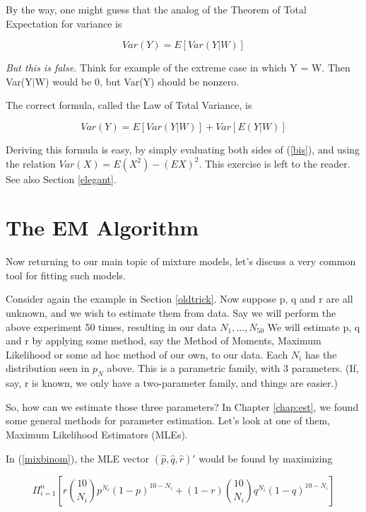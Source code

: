 By the way, one might guess that the analog of the Theorem of Total Expectation
for variance is

\begin{equation}
Var(Y)=E[Var(Y|W)]
\end{equation}

\textit{But this is false.} Think for example of the extreme case in which Y
= W. Then Var(Y$|$W) would be 0, but Var(Y) should be nonzero.

The correct formula, called the Law of Total Variance, is

\begin{equation}
\label{bis}
Var(Y)=E[Var(Y|W)]+Var[E(Y|W)]
\end{equation}

Deriving this formula is easy, by simply evaluating both sides of
(\ref{bis}), and using the relation $Var(X) = E(X^2) -(EX)^2$. This
exercise is left to the reader.  See also Section \ref{elegant}.

\section{The EM Algorithm}
\label{emalg}

Now returning to our main topic of mixture models, let's discuss a very
common tool for fitting such models.

Consider again the example in Section \ref{oldtrick}.  Now suppose p, q
and r are all unknown, and we wish to estimate them from data. Say we
will perform the above experiment 50 times, resulting in our data
$N_1,...,N_{50}$ We will estimate p, q and r by applying some method,
say the Method of Moments, Maximum Likelihood or some ad hoc method of
our own, to our data. Each $N_i$ has the distribution seen in $p_N$
above. This is a parametric family, with 3 parameters. (If, say, r is
known, we only have a two-parameter family, and things are easier.)

So, how can we estimate those three parameters?  In Chapter
\ref{chap:est}, we found some general methods for parameter estimation.
Let's look at one of them, Maximum Likelihood Estimators (MLEs).

In (\ref{mixbinom}), the MLE vector 
$(\widehat{p},
  \widehat{q},
  \widehat{r})'$
would be found by maximizing

\begin{equation}
\Pi_{i=1}^n
\left [ r \binom{10}{N_i} p^{N_i} (1-p)^{10-N_i} +
(1-r) \binom{10}{N_i} q^{N_i} (1-q)^{10-N_i}
\right ]
\end{equation}

